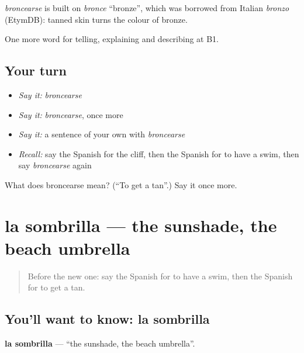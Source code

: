 \begin{cousinweb}
\emph{broncearse} is built on \emph{bronce} \textquotedblleft{}bronze\textquotedblright{}, which was borrowed from Italian \emph{bronzo} (EtymDB): tanned skin turns the colour of bronze.
\end{cousinweb}

\begin{grammarlens}[title={What you've built}]
One more word for telling, explaining and describing at B1.
\end{grammarlens}

\subsection*{Your turn}
\begin{itemize}
\raggedright
  \item \emph{Say it:} \emph{broncearse}
  \item \emph{Say it:} \emph{broncearse}, once more
  \item \emph{Say it:} a sentence of your own with \emph{broncearse}
  \item \emph{Recall:} say the Spanish for the cliff, then the Spanish for to have a swim, then say \emph{broncearse} again
\end{itemize}

\begin{tcolorbox}[breakable,colback=teal!4,colframe=teal!35!black,title={Before you move on}]
What does broncearse mean? (\textquotedblleft{}To get a tan\textquotedblright{}.) Say it once more.
\end{tcolorbox}
\section[la sombrilla]{la sombrilla — the sunshade, the beach umbrella}

\label{lesson:ES-C690-sombrilla}



\begin{quote}
Before the new one: say the Spanish for to have a swim, then the Spanish for to get a tan.
\end{quote}

\subsection*{You'll want to know: la sombrilla}
\textbf{la sombrilla} — \textquotedblleft{}the sunshade, the beach umbrella\textquotedblright{}.

